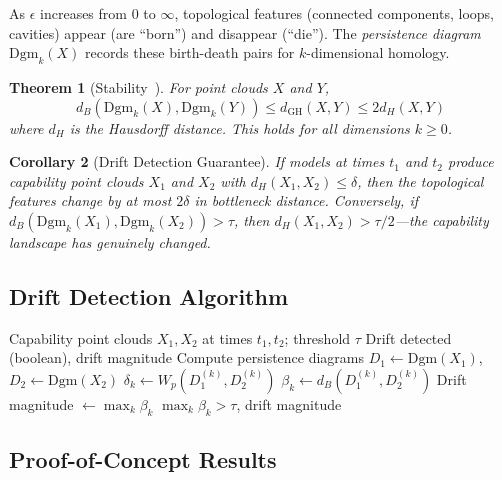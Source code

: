 \documentclass[11pt]{article}
\newtheorem{theorem}{Theorem}[section]
\newtheorem{corollary}[theorem]{Corollary}
\newcommand{\dgm}{\mathrm{Dgm}}
\newcommand{\bott}{d_B}
\newcommand{\wass}{W_p}
\begin{document}
As $\epsilon$ increases from 0 to $\infty$, topological features (connected components, loops, cavities) appear (are ``born'') and disappear (``die''). The \emph{persistence diagram} $\dgm_k(X)$ records these birth-death pairs for $k$-dimensional homology.

\begin{theorem}[Stability~\cite{chazal2021introduction}]
\label{thm:stability}
For point clouds $X$ and $Y$,
\begin{equation}
\bott(\dgm_k(X), \dgm_k(Y)) \leq d_{\mathrm{GH}}(X, Y) \leq 2 d_H(X, Y)
\end{equation}
where $d_H$ is the Hausdorff distance. This holds for all dimensions $k \geq 0$.
\end{theorem}

\begin{corollary}[Drift Detection Guarantee]
If models at times $t_1$ and $t_2$ produce capability point clouds $X_1$ and $X_2$ with $d_H(X_1, X_2) \leq \delta$, then the topological features change by at most $2\delta$ in bottleneck distance. Conversely, if $\bott(\dgm_k(X_1), \dgm_k(X_2)) > \tau$, then $d_H(X_1, X_2) > \tau/2$---the capability landscape has genuinely changed.
\end{corollary}

\subsection{Drift Detection Algorithm}

\begin{algorithm}[h]
\caption{Topological Drift Detection}
\begin{algorithmic}[1]
\REQUIRE Capability point clouds $X_1, X_2$ at times $t_1, t_2$; threshold $\tau$
\ENSURE Drift detected (boolean), drift magnitude
\STATE Compute persistence diagrams $D_1 \leftarrow \dgm(X_1)$, $D_2 \leftarrow \dgm(X_2)$
    \STATE $\delta_k \leftarrow \wass(D_1^{(k)}, D_2^{(k)})$ 
    \STATE $\beta_k \leftarrow \bott(D_1^{(k)}, D_2^{(k)})$ 
\ENDFOR
\STATE Drift magnitude $\leftarrow \max_k \beta_k$
\RETURN $\max_k \beta_k > \tau$, drift magnitude
\end{algorithmic}
\end{algorithm}

\subsection{Proof-of-Concept Results}
\end{document}
